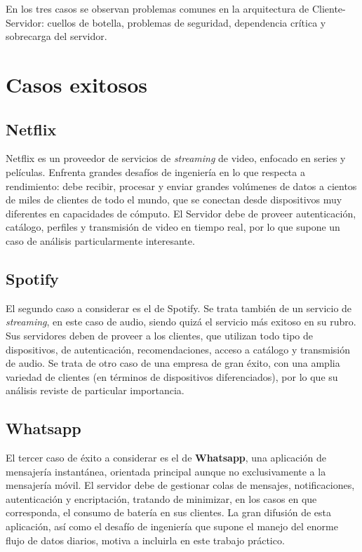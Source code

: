 \documentclass[11pt]{article}
\begin{document}
En los tres casos se observan problemas comunes en la arquitectura de
Cliente-Servidor: cuellos de botella, problemas de seguridad, dependencia
crítica y sobrecarga del servidor.

\section{Casos exitosos}

\subsection{Netflix}

Netflix es un proveedor de servicios de \emph{streaming} de video, enfocado en
series y películas.
Enfrenta grandes desafíos de ingeniería en lo que respecta a rendimiento:
debe recibir, procesar y enviar grandes volúmenes de datos a cientos de miles de
clientes de todo el mundo, que se conectan desde dispositivos muy diferentes en
capacidades de cómputo.
El Servidor debe de proveer autenticación, catálogo, perfiles y transmisión de
video en tiempo real, por lo que supone un caso de análisis particularmente
interesante.

\subsection{Spotify}

El segundo caso a considerar es el de Spotify. Se trata también de un servicio 
de \emph{streaming}, en este caso de audio, siendo quizá el servicio más
exitoso en su rubro. Sus servidores deben de proveer a los clientes, que
utilizan todo tipo de dispositivos, de autenticación, recomendaciones, acceso a 
catálogo y transmisión de audio. Se trata de otro caso de una empresa de gran 
éxito, con una amplia variedad de clientes (en términos de dispositivos
diferenciados), por lo que su análisis reviste de particular importancia.

\subsection{Whatsapp}

El tercer caso de éxito a considerar es el de \textbf{Whatsapp}, una aplicación
de mensajería instantánea, orientada principal aunque no exclusivamente a la 
mensajería móvil. El servidor debe de gestionar colas de mensajes,
notificaciones, autenticación y encriptación, tratando de minimizar, en los
casos en que corresponda, el consumo de batería en sus clientes. La gran
difusión de esta aplicación, así como el desafío de ingeniería que supone el
manejo del enorme flujo de datos diarios, motiva a incluirla en este trabajo 
práctico.
\end{document}
